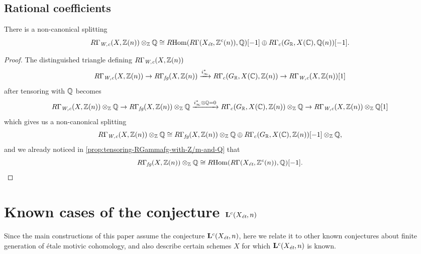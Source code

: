 \documentclass{article}
\numberwithin{equation}{section}
\begin{document}
\subsection*{Rational coefficients}

\begin{proposition}
  There is a non-canonical splitting
  \[ R\Gamma_\Wc (X, \ZZ(n)) \otimes_\ZZ \QQ \cong
    \RHom (R\Gamma (X_\et, \ZZ^c (n)), \QQ) [-1] \oplus
    R\Gamma_c (G_\RR, X (\CC), \QQ (n)) [-1]. \]

  \begin{proof}
    The distinguished triangle defining $R\Gamma_\Wc (X, \ZZ(n))$
    \[ R\Gamma_\Wc (X, \ZZ (n)) \to
      R\Gamma_\fg (X, \ZZ(n)) \xrightarrow{i_\infty^*}
      R\Gamma_c (G_\RR, X (\CC), \ZZ(n)) \to
      R\Gamma_\Wc (X, \ZZ (n)) [1] \]
    after tensoring with $\QQ$ becomes
    \[ R\Gamma_\Wc (X, \ZZ (n))\otimes_\ZZ \QQ \to
      R\Gamma_\fg (X, \ZZ(n))\otimes_\ZZ \QQ \xrightarrow{i_\infty^*\otimes\QQ = 0}
      R\Gamma_c (G_\RR, X (\CC), \ZZ(n))\otimes_\ZZ \QQ \to
      R\Gamma_\Wc (X, \ZZ (n))\otimes_\ZZ \QQ [1] \]
    which gives us a non-canonical splitting
    \cite[Chapitre~II, Corollaire~1.2.6]{Verdier-thesis}
    \[ R\Gamma_\Wc (X, \ZZ (n))\otimes_\ZZ \QQ \cong
      R\Gamma_\fg (X, \ZZ(n))\otimes_\ZZ \QQ \oplus
      R\Gamma_c (G_\RR, X (\CC), \ZZ(n)) [-1]\otimes_\ZZ \QQ, \]
    and we already noticed in \ref{prop:tensoring-RGammafg-with-Z/m-and-Q} that
    \[ R\Gamma_\fg (X, \ZZ (n)) \otimes_\ZZ \QQ \cong
      \RHom (R\Gamma (X_\et, \ZZ^c (n)), \QQ) [-1]. \qedhere \]
  \end{proof}
\end{proposition}


\section{Known cases of the conjecture \texorpdfstring{$\mathbf{L}^c (X_\et,n)$}{L\textasciicircum c (X\_ét, n)}}
\label{sec:known-cases-of-Lc-Xet-n}

Since the main constructions of this paper assume the conjecture
$\mathbf{L}^c (X_\et,n)$, here we relate it to other known conjectures about
finite generation of étale motivic cohomology, and also describe certain schemes
$X$ for which $\mathbf{L}^c (X_\et,n)$ is known.

\vspace{1em}
\end{document}
